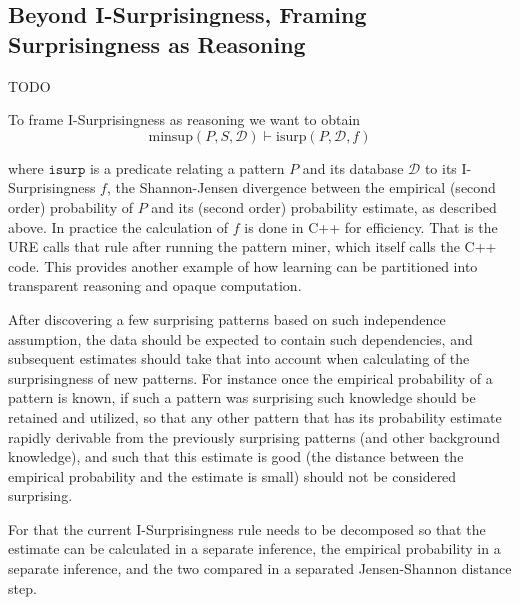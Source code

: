 \documentclass[runningheads]{llncs}
\begin{document}
\subsection{Beyond I-Surprisingness, Framing Surprisingness as
  Reasoning}

TODO

To frame I-Surprisingness as reasoning we want to obtain
$$
\text{minsup}(P, S, \mathcal{D}) \vdash \text{isurp}(P, \mathcal{D}, f)
$$

where $\texttt{isurp}$ is a predicate relating a pattern $P$ and its
database $\mathcal{D}$ to its I-Surprisingness $f$, the Shannon-Jensen
divergence between the empirical (second order) probability of $P$ and
its (second order) probability estimate, as described above. In
practice the calculation of $f$ is done in C++ for efficiency. That is
the URE calls that rule after running the pattern miner, which itself
calls the C++ code. This provides another example of how learning can
be partitioned into transparent reasoning and opaque computation.

After discovering a few surprising patterns based on such independence
assumption, the data should be expected to contain such dependencies,
and subsequent estimates should take that into account when
calculating of the surprisingness of new patterns. For instance once
the empirical probability of a pattern is known, if such a pattern was
surprising such knowledge should be retained and utilized, so that any
other pattern that has its probability estimate rapidly derivable from
the previously surprising patterns (and other background knowledge),
and such that this estimate is good (the distance between the
empirical probability and the estimate is small) should not be
considered surprising.

For that the current I-Surprisingness rule needs to be decomposed so
that the estimate can be calculated in a separate inference, the
empirical probability in a separate inference, and the two compared in
a separated Jensen-Shannon distance step.

\end{document}
